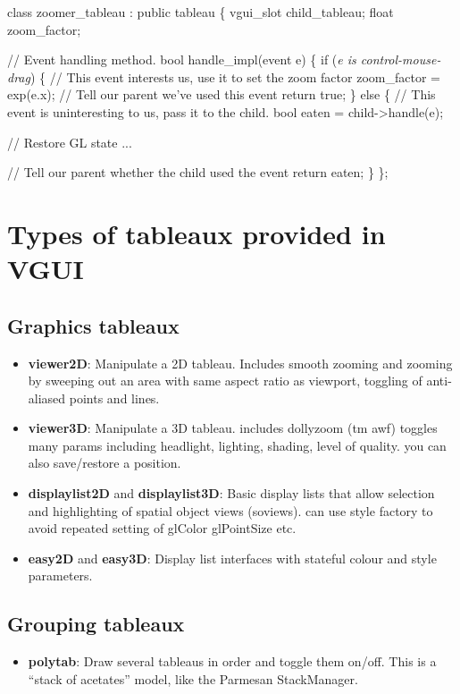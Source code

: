 \documentclass[12pt]{report} \usepackage{epsfig}
\begin{document}
{\scriptsize \begin{verbawf} 
  class zoomer\_tableau : public tableau 
  \{
    vgui_slot child_tableau;
    float zoom\_factor;
 
    // Event handling method.
    bool handle\_impl(event e) 
    \{
      if ({\em e is control-mouse-drag}) 
      \{
        //  This event interests us, use it to set the zoom factor 
        zoom\_factor = exp(e.x);
        //  Tell our parent we've used this event
        return true;
      \} 
      else 
      \{
        //  This event is uninteresting to us, pass it to the child.
        bool eaten = child->handle(e);

        //  Restore GL state 
        ...

        //  Tell our parent whether the child used the event 
        return eaten;
      \}
  \};
\end{verbawf}}
 

\section{Types of tableaux provided in VGUI}
 
\subsection{Graphics tableaux}
\begin{itemize}
\item {\bf viewer2D}:  Manipulate a 2D tableau. Includes smooth zooming and zooming by
            sweeping out an area with same aspect ratio as viewport,
            toggling of anti-aliased points and lines.
\item {\bf viewer3D}: Manipulate a 3D tableau. includes dollyzoom (tm awf) toggles
            many params including headlight, lighting, shading, level of
            quality. you can also save/restore a position.
\item {\bf displaylist2D} and {\bf displaylist3D}: Basic display lists that allow selection 
      and highlighting of spatial object views (soviews). can use style factory to avoid
      repeated setting of glColor glPointSize etc.
\item {\bf easy2D} and {\bf easy3D}: Display list interfaces with stateful colour and style
      parameters.
\end{itemize}

\subsection{Grouping tableaux}
\begin{itemize}
\item {\bf polytab}: Draw several tableaus in order and toggle them on/off.  This is
      a ``stack of acetates'' model, like the Parmesan StackManager.
\end{itemize}
\end{document}
